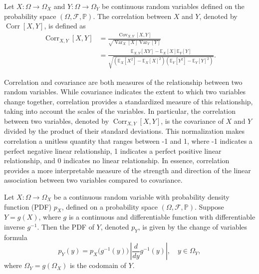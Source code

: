 \begin{definition}[Correlation]
	\label{def:correlation}
	Let $X\colon \Omega \to \Omega_X$ and $Y\colon \Omega \to \Omega_Y$ be continuous random variables defined on the probability space $(\Omega, \mathcal{F}, \mathbb{P})$. The correlation between $X$ and $Y$, denoted by $\operatorname{Corr}[X,Y]$, is defined as
	\begin{equation}
		\begin{split}
			\operatorname{Corr}_{X,Y}[X,Y] &= \frac{\operatorname{Cov}_{X,Y}[X,Y]}{\sqrt{\operatorname{Var}_X[X]  \operatorname{Var}_Y[Y]}} \\
			&= \frac{\mathbb{E}_{X,Y}[XY]-\mathbb{E}_X[X]\mathbb{E}_Y[Y]}{\sqrt{\left(\mathbb{E}_X[X^2] - \mathbb{E}_X[X]^2\right) \left(\mathbb{E}_Y[Y^2] - \mathbb{E}_Y[Y]^2\right)}}.
		\end{split}
	\end{equation}
\end{definition}

\begin{remark}
	Correlation and covariance are both measures of the relationship between two random variables. While covariance indicates the extent to which two variables change together, correlation provides a standardized measure of this relationship, taking into account the scales of the variables. In particular, the correlation between two variables, denoted by $\operatorname{Corr}_{X,Y}[X, Y]$, is the covariance of $X$ and $Y$ divided by the product of their standard deviations. This normalization makes correlation a unitless quantity that ranges between -1 and 1, where -1 indicates a perfect negative linear relationship, 1 indicates a perfect positive linear relationship, and 0 indicates no linear relationship. In essence, correlation provides a more interpretable measure of the strength and direction of the linear association between two variables compared to covariance.
\end{remark}

\begin{definition}
	\label{def:change_of_variables}
	Let $X\colon \Omega \to \Omega_X$ be a continuous random variable with probability density function (PDF) $p_X$, defined on a probability space $(\Omega, \mathcal{F}, \mathbb{P})$. Suppose $Y = g(X)$, where $g$ is a continuous and differentiable function with differentiable inverse $g^{-1}$. Then the PDF of $Y$, denoted $p_Y$, is given by the change of variables formula~\cite{Sivia2006}
	\begin{equation}
		p_Y(y) = p_X\bigl(g^{-1}(y)\bigr) \, \left| \frac{d}{dy} g^{-1}(y) \right|, \quad y \in \Omega_Y,
	\end{equation}
	where $\Omega_Y = g(\Omega_X)$ is the codomain of $Y$.
\end{definition}

